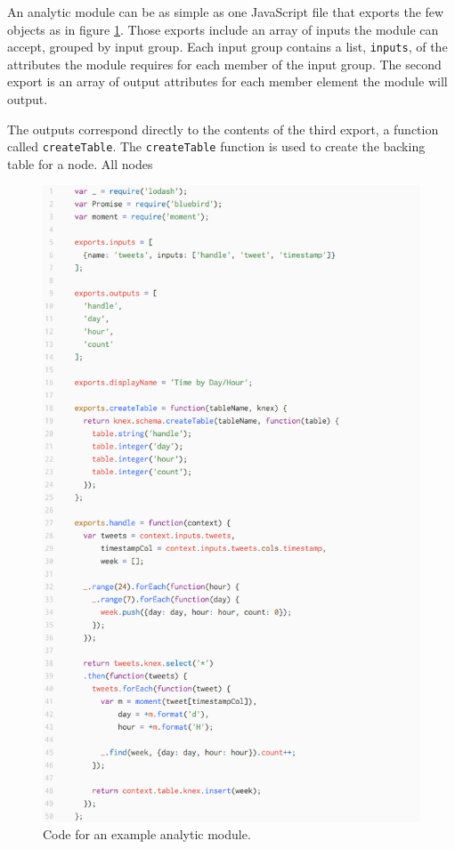 \documentclass[midd]{thesis}
\begin{document}
An analytic module can be as simple as one JavaScript file that exports the few
objects as in figure \ref{fig:analyticmodule}. Those exports include an array
of inputs the module can accept, grouped by input group. Each input group
contains a list, \texttt{inputs}, of the attributes the module requires for each
member of the input group. The second export is an array of output attributes
for each member element the module will output.

The outputs correspond directly to the contents of the third export, a function
called \texttt{createTable}. The \texttt{createTable} function is used to create
the backing table for a node. All nodes

\begin{figure}[!ht]
  \centering
  \includegraphics[width=.85\textwidth]{analyticmodule}
  \caption{Code for an example analytic module.}
  \label{fig:analyticmodule}
\end{figure}
\end{document}
